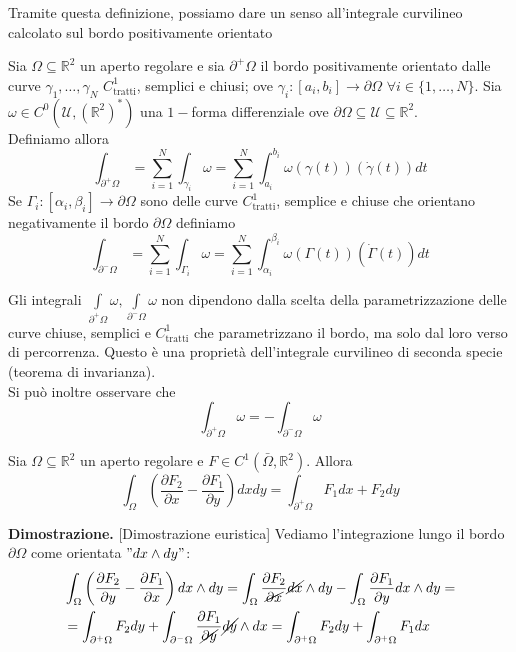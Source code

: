 %
Tramite questa definizione, possiamo dare un senso all'integrale curvilineo calcolato sul bordo positivamente orientato
%
\vspace{0.5cm}
\begin{definition}[\textcolor{blue}{integrale curvilineo sul bordo positivamente orientato}]
	Sia $\Omega \subseteq \mathbb{R}^2$ un aperto regolare e sia $\partial^{+} \Omega$ il bordo positivamente orientato dalle curve $\gamma_1, \ldots, \gamma_N$ $C^1_\text{tratti}$, semplici e chiusi; ove
	$\gamma_i: [a_i, b_i] \to \partial \Omega \, \, \forall i \in \{1, \ldots, N \}$. Sia $\omega \in C^0(\mathcal{U}, (\mathbb{R}^2)^*)$ una $1-$forma differenziale ove $\partial \Omega \subseteq \mathcal{U} \subseteq \mathbb{R}^2$. \\
	Definiamo allora
	$$
	\int_{\partial^{+} \Omega} = \sum_{i=1}^N \int_{\gamma_i} \omega = \sum_{i=1}^N \int_{a_i}^{b_i} \omega(\gamma(t))(\dot{\gamma}(t))dt
	$$
	Se $\Gamma_i: [\alpha_i, \beta_i] \to \partial \Omega$ sono delle curve $C^1_\text{tratti}$, semplice e chiuse che orientano negativamente il bordo $\partial \Omega$ definiamo
	$$
	\int_{\partial^{-} \Omega} = \sum_{i=1}^N \int_{\Gamma_i} \omega = \sum_{i=1}^N \int_{\alpha_i}^{\beta_i} \omega(\Gamma(t))(\dot{\Gamma}(t))dt
	$$
\end{definition}
%
\begin{remark}
	Gli integrali $\int\limits_{\partial^{+} \Omega} \omega, \int\limits_{\partial^{-} \Omega} \omega$ non dipendono dalla scelta della parametrizzazione delle curve chiuse, semplici e $C^1_\text{tratti}$ che parametrizzano il bordo, ma solo dal
	loro verso di percorrenza. Questo è una proprietà dell'integrale curvilineo di seconda specie (teorema di invarianza). \\
	Si può inoltre osservare che
	$$
	\int_{\partial^{+} \Omega} \omega = - \int_{\partial^{-} \Omega} \omega
	$$
\end{remark}
%
\vspace{0.5cm}
\begin{theorem}[\textcolor{blue}{di Gauss-Green nel piano}]
	Sia $\Omega \subseteq \mathbb{R}^2$ un aperto regolare e $F \in C^1(\bar{\Omega}, \mathbb{R}^2)$. Allora
	$$
	\int_\Omega \left( \frac{\partial F_2}{\partial x} - \frac{\partial F_1}{\partial y} \right) dxdy = \int_{\partial^{+} \Omega} F_1dx + F_2dy
	$$
\end{theorem}
%
\noindent \textbf{Dimostrazione. } [Dimostrazione euristica]
	Vediamo l'integrazione lungo il bordo $\partial \Omega$ come orientata $"dx \wedge dy"$:
	\begin{align*}
	&\int_\Omega \left(\frac{\partial F_2}{\partial y} - \frac{\partial F_1}{\partial x} \right) dx \wedge dy = \int_\Omega \frac{\partial F_2}{\cancel{\partial x}} \cancel{dx} \wedge dy - \int_{\Omega} \frac{\partial F_1}{\partial y} dx \wedge dy = \\
	&=\int_{\partial^{+} \Omega} F_2 dy + \int_{\partial^{-} \Omega} \frac{\partial F_1}{\cancel{\partial y}} \cancel{dy} \wedge dx = \int_{\partial^{+} \Omega} F_2 dy + \int_{\partial^{+} \Omega} F_1 dx
	\end{align*}
